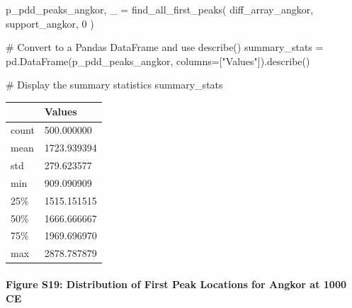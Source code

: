 \documentclass[
  11pt,
  letterpaper,
  DIV=11,
  numbers=noendperiod]{scrartcl}
\let\oldparagraph\paragraph
\renewcommand{\paragraph}[1]{\oldparagraph{#1}\mbox{}}
\newenvironment{Shaded}{\begin{snugshade}}{\end{snugshade}}
\newcommand{\CommentTok}[1]{\textcolor[rgb]{0.37,0.37,0.37}{#1}}
\newcommand{\DecValTok}[1]{\textcolor[rgb]{0.68,0.00,0.00}{#1}}
\newcommand{\NormalTok}[1]{\textcolor[rgb]{0.00,0.23,0.31}{#1}}
\newcommand{\OperatorTok}[1]{\textcolor[rgb]{0.37,0.37,0.37}{#1}}
\newcommand{\StringTok}[1]{\textcolor[rgb]{0.13,0.47,0.30}{#1}}
\begin{document}
\begin{Shaded}
\begin{Highlighting}[]
\NormalTok{p\_pdd\_peaks\_angkor, \_ }\OperatorTok{=}\NormalTok{ find\_all\_first\_peaks(}
\NormalTok{    diff\_array\_angkor, }
\NormalTok{    support\_angkor, }
    \DecValTok{0}
\NormalTok{)}

\CommentTok{\# Convert to a Pandas DataFrame and use describe()}
\NormalTok{summary\_stats }\OperatorTok{=}\NormalTok{ pd.DataFrame(p\_pdd\_peaks\_angkor, columns}\OperatorTok{=}\NormalTok{[}\StringTok{"Values"}\NormalTok{]).describe()}

\CommentTok{\# Display the summary statistics}
\NormalTok{summary\_stats}
\end{Highlighting}
\end{Shaded}

\begin{longtable}[]{@{}ll@{}}
\toprule\noalign{}
& Values \\
\midrule\noalign{}
\endhead
\bottomrule\noalign{}
\endlastfoot
count & 500.000000 \\
mean & 1723.939394 \\
std & 279.623577 \\
min & 909.090909 \\
25\% & 1515.151515 \\
50\% & 1666.666667 \\
75\% & 1969.696970 \\
max & 2878.787879 \\
\end{longtable}

\paragraph{Figure S19: Distribution of First Peak Locations for Angkor
at 1000
CE}\label{figure-s19-distribution-of-first-peak-locations-for-angkor-at-1000-ce}
\end{document}
